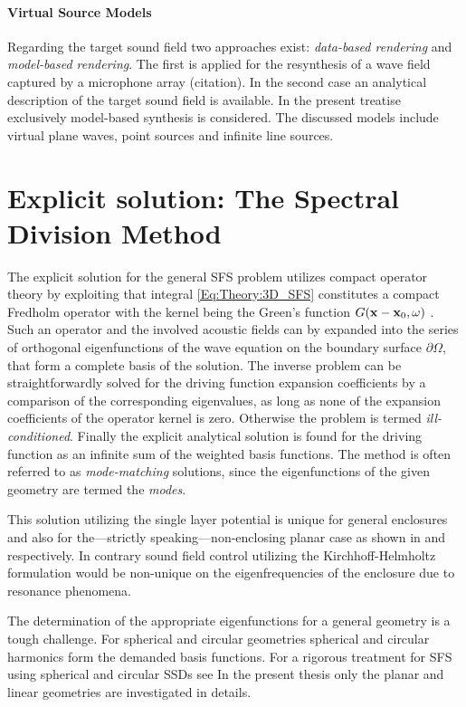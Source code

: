 \paragraph{Virtual Source Models}
Regarding the target sound field two approaches exist: \emph{data-based rendering} and \emph{model-based rendering}. The first is applied for the resynthesis of a wave field captured by a microphone array (citation). In the second case an analytical description of the target sound field is available. In the present treatise exclusively model-based synthesis is considered. The discussed models include virtual plane waves, point sources and infinite line sources.


\newpage
\section{Explicit solution: The Spectral Division Method}

The explicit solution for the general SFS problem utilizes compact operator theory by exploiting that integral \eqref{Eq:Theory:3D_SFS} constitutes a compact Fredholm operator with the kernel being the Green's function $G(\mathbf{x} - \mathbf{x}_0 , \omega )$ \cite{Ahrens2012,MorseFeshbach1953}.
Such an operator and the involved acoustic fields can by expanded into the series of orthogonal eigenfunctions of the wave equation on the boundary surface $\partial \Omega$, that form a complete basis of the solution.
The inverse problem can be straightforwardly solved for the driving function expansion coefficients by a comparison of the corresponding eigenvalues, as long as none of the expansion coefficients of the operator kernel is zero.
Otherwise the problem is termed \emph{ill-conditioned}.
Finally the explicit analytical solution is found for the driving function as an infinite sum of the weighted basis functions.
The method is often referred to as \emph{mode-matching} solutions, since the eigenfunctions of the given geometry are termed the \emph{modes}.

This solution utilizing the single layer potential is unique for general enclosures and also for the---strictly speaking---non-enclosing planar case as shown in \cite{Zotter2013:uniqueness} and \cite{Fazi2010} respectively. In contrary sound field control utilizing the Kirchhoff-Helmholtz formulation would be non-unique on the eigenfrequencies of the enclosure due to resonance phenomena.

The determination of the appropriate eigenfunctions for a general geometry is a tough challenge.
For spherical and circular geometries spherical and circular harmonics form the demanded basis functions. For a rigorous treatment for SFS using spherical and circular SSDs see \cite{Ahrens2010phd,Zotter2009phd,Ahrens2012,Ahrens2009:circularSSD_mismatch,Ahrens2009:circular25D_SFR,Ahrens2008:Analytical_Circ_Spherical_SFS}
In the present thesis only the planar and linear geometries are investigated in details.


